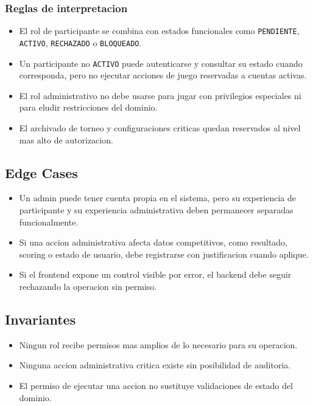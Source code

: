 \subsubsection{Reglas de interpretacion}

\begin{itemize}
  \item El rol de participante se combina con estados funcionales como \texttt{PENDIENTE}, \texttt{ACTIVO}, \texttt{RECHAZADO} o \texttt{BLOQUEADO}.
  \item Un participante no \texttt{ACTIVO} puede autenticarse y consultar su estado cuando corresponda, pero no ejecutar acciones de juego reservadas a cuentas activas.
  \item El rol administrativo no debe usarse para jugar con privilegios especiales ni para eludir restricciones del dominio.
  \item El archivado de torneo y configuraciones criticas quedan reservados al nivel mas alto de autorizacion.
\end{itemize}

\subsection{Edge Cases}

\begin{itemize}
  \item Un admin puede tener cuenta propia en el sistema, pero su experiencia de participante y su experiencia administrativa deben permanecer separadas funcionalmente.
  \item Si una accion administrativa afecta datos competitivos, como resultado, scoring o estado de usuario, debe registrarse con justificacion cuando aplique.
  \item Si el frontend expone un control visible por error, el backend debe seguir rechazando la operacion sin permiso.
\end{itemize}

\subsection{Invariantes}

\begin{itemize}
  \item Ningun rol recibe permisos mas amplios de lo necesario para su operacion.
  \item Ninguna accion administrativa critica existe sin posibilidad de auditoria.
  \item El permiso de ejecutar una accion no sustituye validaciones de estado del dominio.
\end{itemize}

